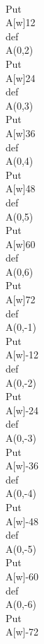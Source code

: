     \\Put\\A[w]{12}
    \\def\\A{(0,2)}
    \\Put\\A[w]{24}
    \\def\\A{(0,3)}
    \\Put\\A[w]{36}
    \\def\\A{(0,4)}
    \\Put\\A[w]{48}
    \\def\\A{(0,5)}
    \\Put\\A[w]{60}
    \\def\\A{(0,6)}
    \\Put\\A[w]{72}
    \\def\\A{(0,-1)}
    \\Put\\A[w]{-12}
    \\def\\A{(0,-2)}
    \\Put\\A[w]{-24}
    \\def\\A{(0,-3)}
    \\Put\\A[w]{-36}
    \\def\\A{(0,-4)}
    \\Put\\A[w]{-48}
    \\def\\A{(0,-5)}
    \\Put\\A[w]{-60}
    \\def\\A{(0,-6)}
    \\Put\\A[w]{-72} 
